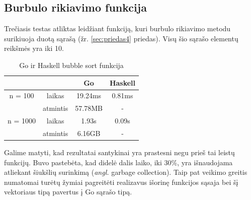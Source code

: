 \documentclass{VUMIFPSbakalaurinis}
\begin{document}
\subsection{Burbulo rikiavimo funkcija}
Trečiasis testas atliktas leidžiant funkciją, kuri burbulo rikiavimo metodu surikiuoja duotą sąrašą (žr. \ref{sec:priedas4} priedas). Visų šio sąrašo elementų reikšmės yra iki 10.
			\begin{center}
				\centering
				\begin{table}[H]
					\caption{Go ir Haskell bubble sort funkcija}
					\centering
				\begin{tabular}{ cccc } 
				& & \textbf{Go} & \textbf{Haskell}  \\
				\midrule
				n = 100 & laikas & 19.24ms & 0.81ms    \\
				 & atmintis & 57.78MB & -  \\
				\midrule
				n = 1000 & laikas & 1.93s & 0.09s  \\
				 & atmintis & 6.16GB & - \\
				\midrule
				\end{tabular}
				\centering
			\end{table}
				\end{center}
Galime matyti, kad rezultatai santykinai yra prastesni negu prieš tai leistų funkcijų. Buvo pastebėta, kad didelė dalis laiko, iki 30\%, yra išnaudojama atliekant šiukšlių surinkimą (\textit{angl.} garbage collection). Taip pat veikimo greitis numatomai turėtų žymiai pagreitėti realizavus išorinę funkcijos sąsaja bei šį vektoriaus tipą pavertus į Go sąrašo tipą.
\end{document}

